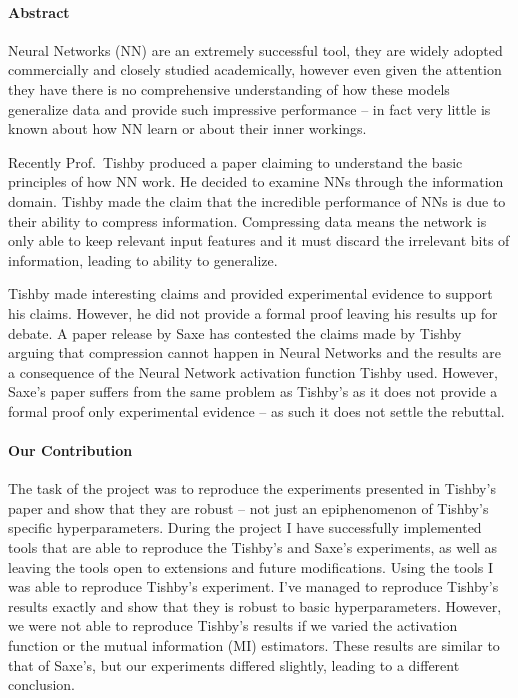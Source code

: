 \documentclass[dissertation.tex]{subfiles}
\begin{document}
\paragraph{Abstract}
Neural Networks (NN) are an extremely successful tool, they are widely adopted
commercially and closely studied academically, however even given the attention
they have there is no comprehensive understanding of how these models generalize
data and provide such impressive performance -- in fact very little is known
about how NN learn or about their inner workings. 

Recently Prof.\ Tishby
\cite{TISHBY} produced a paper claiming to understand the basic principles of
how NN work. He decided to examine NNs through the information domain. Tishby
made the claim that the incredible performance of NNs is due to their ability to
compress information. Compressing data means the network is only able to keep
relevant input features and it must discard the irrelevant bits of information,
leading to ability to generalize. 

Tishby made interesting claims and provided experimental evidence to support his
claims. However, he did not provide a formal proof leaving his results up for
debate. A paper release by Saxe \cite{SAXE} has contested the claims made by
Tishby arguing that compression cannot happen in Neural Networks and the results
are a consequence of the Neural Network activation function Tishby used.
However, Saxe's paper suffers from the same problem as Tishby's as it does not
provide a formal proof only experimental evidence -- as such it does not settle
the rebuttal.

\paragraph{Our Contribution}
The task of the project was to reproduce the experiments presented in Tishby's
paper and show that they are robust -- not just an epiphenomenon of Tishby's
specific hyperparameters. During the project I have successfully implemented
tools that are able to reproduce the Tishby's and Saxe's experiments, as well as
leaving the tools open to extensions and future modifications. Using the tools I
was able to reproduce Tishby's experiment. I've managed to reproduce Tishby's
results exactly and show that they is robust to basic hyperparameters. However,
we were not able to reproduce Tishby's results if we varied the activation
function or the mutual information (MI) estimators. These results are similar to
that of Saxe's, but our experiments differed slightly, leading to a different
conclusion.
\end{document}
